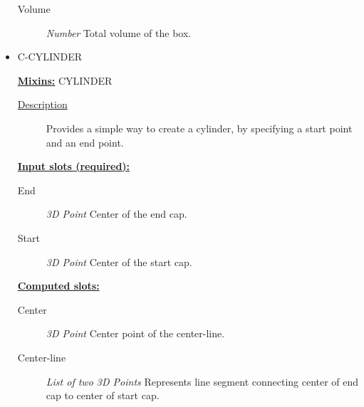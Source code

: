 \documentclass [11pt]{book}
\begin{document}
\begin{itemize}
\begin{description}

\item [Volume]
\emph{Number} Total volume of the box.


\end{description}







\item {}C-CYLINDER


\textbf{
\underline{Mixins:}} CYLINDER





\begin{description}

\item [
\underline{Description}]


Provides a simple way to create a cylinder, by specifying a start point and an end point.



\end{description}








\textbf{
\underline{Input slots (required):}}

\begin{description}

\item [End]
\emph{3D Point} Center of the end cap.


\item [Start]
\emph{3D Point} Center of the start cap.


\end{description}






\textbf{
\underline{Computed slots:}}

\begin{description}

\item [Center]
\emph{3D Point} Center point of the center-line.


\item [Center-line]
\emph{List of two 3D Points} Represents line segment connecting center of end cap to center of start cap.



\end{description}
\end{itemize}
\end{document}
